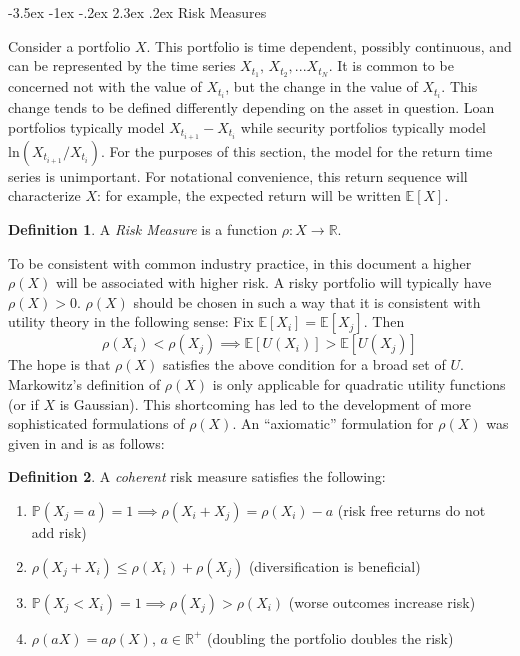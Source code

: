 \documentclass[12pt]{article}
\makeatletter
\theoremstyle{definition}
\newtheorem{riskmeasure}{Definition}
\renewcommand\section{\@startsection{section}{1}{\z@}%
                                  {-3.5ex \@plus -1ex \@minus -.2ex}%
                                  {2.3ex \@plus.2ex}%
                                  {\normalfont\large\bfseries}}
\makeatother
\begin{document}
\section{Risk Measures}

Consider a portfolio \(X\).  This portfolio is time dependent, possibly continuous, and can be represented by the time series \(X_{t_1},\, X_{t_2},...X_{t_N}\).  It is common to be concerned not with the value of \(X_{t_i}\), but the change in the value of \(X_{t_i}\).  This change tends to be defined differently depending on the asset in question.  Loan portfolios typically model \(X_{t_{i+1}}-X_{t_i}\) while security portfolios typically model \(\mathrm{ln}(X_{t_{i+1}}/X_{t_i})\).  For the purposes of this section, the model for the return time series is unimportant. For notational convenience, this return sequence will characterize \(X\): for example, the expected return will be written \(\mathbb{E}[X]\).  

\begin{riskmeasure}
A \emph{Risk Measure} is a function \(\rho: X \to \mathbb{R}\).  
\end{riskmeasure}

To be consistent with common industry practice, in this document a higher \(\rho(X)\) will be associated with higher risk.  A risky portfolio will typically have \(\rho(X)>0\).  \(\rho(X)\) should be chosen in such a way that it is consistent with utility theory in the following sense: Fix \(\mathbb{E}[X_i]=\mathbb{E}[X_j]\).  Then
\[\rho(X_i) < \rho(X_j) \implies \mathbb{E}[U(X_i)] > \mathbb{E}[U(X_j)] \]
The hope is that \(\rho(X)\) satisfies the above condition for a broad set of \(U\).  Markowitz's definition of \(\rho(X)\) is only applicable for quadratic utility functions (or if \(X\) is Gaussian).  This shortcoming has led to the development of more sophisticated formulations of \(\rho(X)\).  An ``axiomatic'' formulation for \(\rho(X)\) was given in \cite{artzner1999} and is as follows:

\begin{riskmeasure}
A \emph{coherent} risk measure satisfies the following:
\begin{enumerate}
\item \(\mathbb{P}(X_j=a)=1 \implies \rho(X_i+X_j)=\rho(X_i)-a\) (risk free returns do not add risk)
\item \(\rho(X_j+X_i) \leq \rho(X_i)+\rho(X_j)\) (diversification is beneficial) 
\item \(\mathbb{P}(X_j<X_i)=1 \implies \rho(X_j) > \rho(X_i)\) (worse outcomes increase risk)
\item \(\rho(aX)=a\rho(X), \, a \in \mathbb{R} ^+ \) (doubling the portfolio doubles the risk)

\end{enumerate}
\end{riskmeasure}
\end{document}
